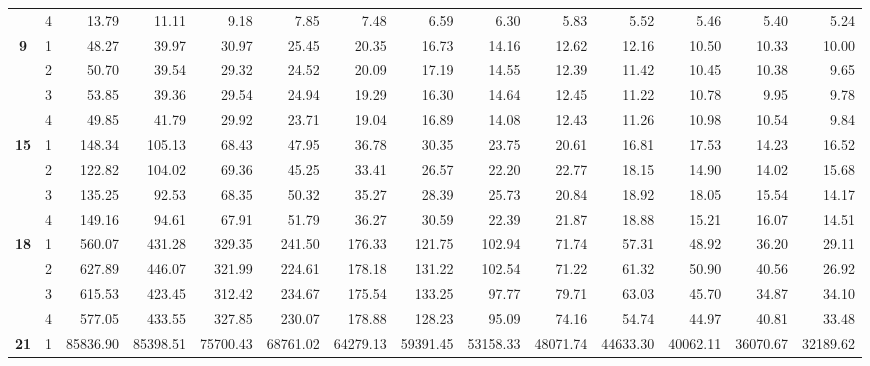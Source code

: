 \begin{table}[h!]
{\begin{tabular}{@{} ccrrrrrrrrrrrr}
   & 4 & 13.79     & 11.11     & 9.18      & 7.85      & 7.48      & 6.59      & 6.30      & 5.83      & 5.52      & 5.46      & 5.40      & 5.24      \\
\textbf{9}  & 1 & 48.27     & 39.97     & 30.97     & 25.45     & 20.35     & 16.73     & 14.16     & 12.62     & 12.16     & 10.50     & 10.33     & 10.00     \\
   & 2 & 50.70     & 39.54     & 29.32     & 24.52     & 20.09     & 17.19     & 14.55     & 12.39     & 11.42     & 10.45     & 10.38     & 9.65      \\
   & 3 & 53.85     & 39.36     & 29.54     & 24.94     & 19.29     & 16.30     & 14.64     & 12.45     & 11.22     & 10.78     & 9.95      & 9.78      \\
   & 4 & 49.85     & 41.79     & 29.92     & 23.71     & 19.04     & 16.89     & 14.08     & 12.43     & 11.26     & 10.98     & 10.54     & 9.84      \\
\textbf{15} & 1 & 148.34    & 105.13    & 68.43     & 47.95     & 36.78     & 30.35     & 23.75     & 20.61     & 16.81     & 17.53     & 14.23     & 16.52     \\
   & 2 & 122.82    & 104.02    & 69.36     & 45.25     & 33.41     & 26.57     & 22.20     & 22.77     & 18.15     & 14.90     & 14.02     & 15.68     \\
   & 3 & 135.25    & 92.53     & 68.35     & 50.32     & 35.27     & 28.39     & 25.73     & 20.84     & 18.92     & 18.05     & 15.54     & 14.17     \\
   & 4 & 149.16    & 94.61     & 67.91     & 51.79     & 36.27     & 30.59     & 22.39     & 21.87     & 18.88     & 15.21     & 16.07     & 14.51     \\
\textbf{18} & 1 & 560.07    & 431.28    & 329.35    & 241.50    & 176.33    & 121.75    & 102.94    & 71.74     & 57.31     & 48.92     & 36.20     & 29.11     \\
   & 2 & 627.89    & 446.07    & 321.99    & 224.61    & 178.18    & 131.22    & 102.54    & 71.22     & 61.32     & 50.90     & 40.56     & 26.92     \\
   & 3 & 615.53    & 423.45    & 312.42    & 234.67    & 175.54    & 133.25    & 97.77     & 79.71     & 63.03     & 45.70     & 34.87     & 34.10     \\
   & 4 & 577.05    & 433.55    & 327.85    & 230.07    & 178.88    & 128.23    & 95.09     & 74.16     & 54.74     & 44.97     & 40.81     & 33.48     \\
\textbf{21} & 1 & 85836.90  & 85398.51  & 75700.43  & 68761.02  & 64279.13  & 59391.45  & 53158.33  & 48071.74  & 44633.30  & 40062.11  & 36070.67  & 32189.62  \\

\end{tabular}}
\end{table}
